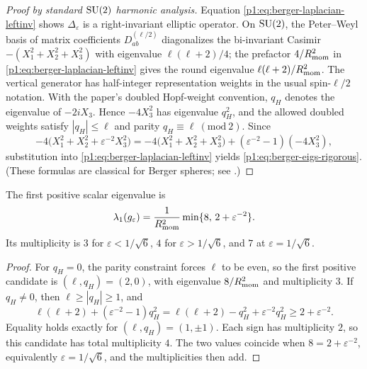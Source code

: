 \documentclass[11pt]{article}
\begin{document}
\begin{proof}[Proof by standard $\mathrm{SU}(2)$ harmonic analysis]
Equation \eqref{p1:eq:berger-laplacian-leftinv} shows $\Delta_\varepsilon$ is a right-invariant elliptic operator.
On $\mathrm{SU}(2)$, the Peter--Weyl basis of matrix coefficients $D^{(\ell/2)}_{ab}$ diagonalizes the bi-invariant
Casimir $-(X_1^2+X_2^2+X_3^2)$ with eigenvalue $\ell(\ell+2)/4$; the prefactor $4/R_{\mathrm{mom}}^2$ in \eqref{p1:eq:berger-laplacian-leftinv} gives the round eigenvalue $\ell(\ell+2)/R_{\mathrm{mom}}^2$.
The vertical generator has half-integer representation weights in the usual spin-$\ell/2$ notation.  With the paper's doubled Hopf-weight convention, $q_H$ denotes the eigenvalue of $-2iX_3$. Hence $-4X_3^2$ has eigenvalue $q_H^2$, and the allowed doubled weights satisfy
$|q_H|\le \ell$ and parity $q_H\equiv\ell\ (\mathrm{mod}\ 2)$.
Since
\[
-4\bigl(X_1^2+X_2^2+\varepsilon^{-2}X_3^2\bigr)
=
-4\bigl(X_1^2+X_2^2+X_3^2\bigr)+(\varepsilon^{-2}-1)(-4X_3^2),
\]
substitution into \eqref{p1:eq:berger-laplacian-leftinv} yields \eqref{p1:eq:berger-eigs-rigorous}.
(These formulas are classical for Berger spheres; see \cite{berger1960spectre,besse1978manifolds}.)
\end{proof}

\begin{corollary}
\label{p1:cor:berger-first-positive-eigenvalue}
The first positive scalar eigenvalue is
\[
    \lambda_1(g_\varepsilon)
    =
    \frac1{R_{\mathrm{mom}}^2}\min\{8,\,2+\varepsilon^{-2}\}.
\]
Its multiplicity is \(3\) for
\(\varepsilon<1/\sqrt6\), \(4\) for
\(\varepsilon>1/\sqrt6\), and \(7\) at
\(\varepsilon=1/\sqrt6\).
\end{corollary}

\begin{proof}
For \(q_H=0\), the parity constraint forces \(\ell\) to be even, so the first
positive candidate is \((\ell,q_H)=(2,0)\), with eigenvalue
\(8/R_{\mathrm{mom}}^2\) and multiplicity \(3\).  If \(q_H\ne0\), then
\(\ell\ge |q_H|\ge1\), and
\[
\ell(\ell+2)+(\varepsilon^{-2}-1)q_H^2
=\ell(\ell+2)-q_H^2+\varepsilon^{-2}q_H^2
\ge 2+\varepsilon^{-2}.
\]
Equality holds exactly for \((\ell,q_H)=(1,\pm1)\).  Each sign has
multiplicity \(2\), so this candidate has total multiplicity \(4\).
The two values coincide when
\(8=2+\varepsilon^{-2}\), equivalently
\(\varepsilon=1/\sqrt6\), and the multiplicities then add.
\end{proof}
\end{document}
